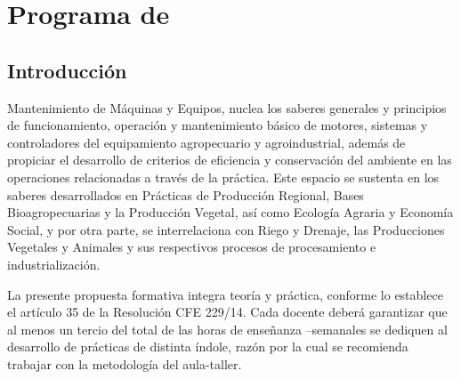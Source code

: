 \documentclass[../main]{subfiles}
\begin{document}
\chapter*{Programa de \materiaLong}
\section*{Introducción}

Mantenimiento de Máquinas y Equipos, nuclea los saberes generales y
principios de funcionamiento, operación y mantenimiento básico de motores, sistemas
y controladores del equipamiento agropecuario y agroindustrial, además de propiciar el desarrollo de criterios de eficiencia y conservación del ambiente en las operaciones relacionadas a través de la práctica.
Este espacio se sustenta en los saberes desarrollados en Prácticas de
Producción Regional, Bases Bioagropecuarias y la Producción Vegetal, así como
Ecología Agraria y Economía Social, y por otra parte, se interrelaciona con Riego y
Drenaje, las Producciones Vegetales y Animales y sus respectivos procesos de
procesamiento e industrialización.

La presente propuesta formativa integra teoría y práctica, conforme lo
establece el artículo 35 de la Resolución CFE 229/14. Cada docente deberá garantizar
que al menos un tercio del total de las horas de enseñanza –semanales se dediquen al
desarrollo de prácticas de distinta índole, razón por la cual se recomienda trabajar con
la metodología del aula-taller. 
\end{document}

